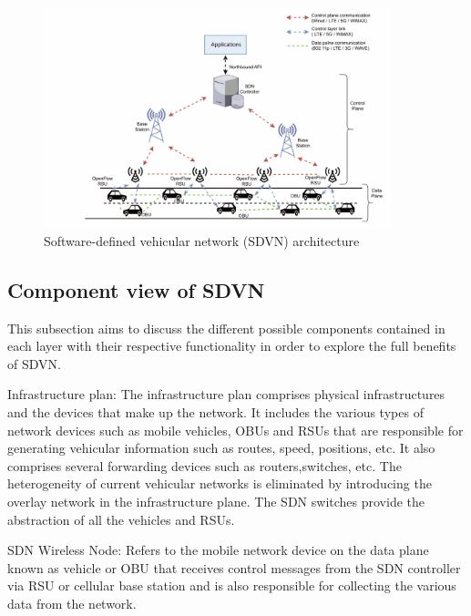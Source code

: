 \documentclass[
  oneside,
  11pt, a4paper,
  footinclude=true,
  headinclude=true,
  cleardoublepage=empty
]{scrbook}
\begin{document}
\begin{figure}[H]
\begin{center}
  \includegraphics[width=0.9\textwidth]{img/sdvn1.png}
\end{center}
  \caption{Software-defined vehicular network (SDVN) architecture ~\cite{Bhatia2019sdvn}}
  \centering  
\label{sdvn}
\end{figure}


\subsection{Component view of SDVN}
\label{Component-view-of-SDVN}

This subsection aims to discuss the different possible components contained in each layer with their respective functionality in order to explore the full benefits of SDVN.

Infrastructure plan: The infrastructure plan comprises physical infrastructures and the devices that make up the network. It includes the various types of network devices such as mobile vehicles, OBUs and RSUs that are responsible for generating vehicular information such as routes, speed, positions, etc. It also comprises several forwarding devices such as routers,switches, etc. The heterogeneity of current vehicular networks is eliminated by introducing the overlay network in the infrastructure plane. The SDN switches provide the abstraction of all the vehicles and RSUs.\par
SDN Wireless Node: Refers to the mobile network device on the data plane known as vehicle or OBU that receives control messages from the SDN controller via RSU or cellular base station and is also responsible for collecting the various data from the network.
\end{document}
